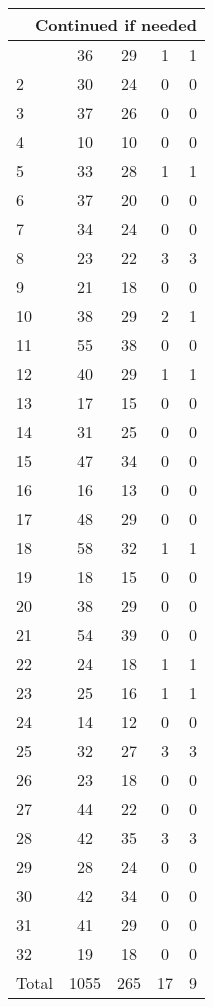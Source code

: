 \begin{center}
\begin{longtable}{l|c|c|c|c}
\hline \multicolumn{5}{|r|}{{Continued if needed}} \\ \hline
\endfoot 
1 & 36 & 29 & 1 & 1\\ \hline
2 & 30 & 24 & 0 & 0\\ \hline
3 & 37 & 26 & 0 & 0\\ \hline
4 & 10 & 10 & 0 & 0\\ \hline
5 & 33 & 28 & 1 & 1\\ \hline
6 & 37 & 20 & 0 & 0\\ \hline
7 & 34 & 24 & 0 & 0\\ \hline
8 & 23 & 22 & 3 & 3\\ \hline
9 & 21 & 18 & 0 & 0\\ \hline
10 & 38 & 29 & 2 & 1\\ \hline
11 & 55 & 38 & 0 & 0\\ \hline
12 & 40 & 29 & 1 & 1\\ \hline
13 & 17 & 15 & 0 & 0\\ \hline
14 & 31 & 25 & 0 & 0\\ \hline
15 & 47 & 34 & 0 & 0\\ \hline
16 & 16 & 13 & 0 & 0\\ \hline
17 & 48 & 29 & 0 & 0\\ \hline
18 & 58 & 32 & 1 & 1\\ \hline
19 & 18 & 15 & 0 & 0\\ \hline
20 & 38 & 29 & 0 & 0\\ \hline
21 & 54 & 39 & 0 & 0\\ \hline
22 & 24 & 18 & 1 & 1\\ \hline
23 & 25 & 16 & 1 & 1\\ \hline
24 & 14 & 12 & 0 & 0\\ \hline
25 & 32 & 27 & 3 & 3\\ \hline
26 & 23 & 18 & 0 & 0\\ \hline
27 & 44 & 22 & 0 & 0\\ \hline
28 & 42 & 35 & 3 & 3\\ \hline
29 & 28 & 24 & 0 & 0\\ \hline
30 & 42 & 34 & 0 & 0\\ \hline
31 & 41 & 29 & 0 & 0\\ \hline
32 & 19 & 18 & 0 & 0\\ \hline
\hline \hline
Total & 1055 & 265 & 17 & 9



\end{longtable}
\end{center}

